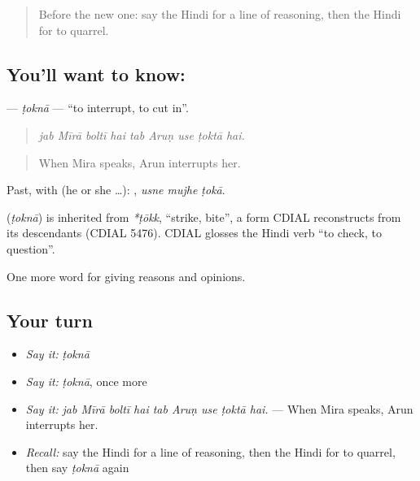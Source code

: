 \label{lesson:HI-C346-tokna}



\begin{quote}
Before the new one: say the Hindi for a line of reasoning, then the Hindi for to quarrel.
\end{quote}

\subsection*{You'll want to know: }
\textbf{} — \emph{ṭoknā} — \textquotedblleft{}to interrupt, to cut in\textquotedblright{}.

\begin{quote}
        
\end{quote}

\begin{quote}
\emph{jab Mīrā boltī hai tab Aruṇ use ṭoktā hai.}
\end{quote}

\begin{quote}
When Mira speaks, Arun interrupts her.
\end{quote}

Past, with  (he or she …):   , \emph{usne mujhe ṭokā}.

\begin{cousinweb}
\textbf{} (\emph{ṭoknā}) is inherited from \emph{*ṭōkk}, \textquotedblleft{}strike, bite\textquotedblright{}, a form CDIAL reconstructs from its descendants (CDIAL 5476). CDIAL glosses the Hindi verb \textquotedblleft{}to check, to question\textquotedblright{}.
\end{cousinweb}

\begin{grammarlens}[title={What you've built}]
One more word for giving reasons and opinions.
\end{grammarlens}

\subsection*{Your turn}
\begin{itemize}
\raggedright
  \item \emph{Say it:} \emph{ṭoknā}
  \item \emph{Say it:} \emph{ṭoknā}, once more
  \item \emph{Say it:} \emph{jab Mīrā boltī hai tab Aruṇ use ṭoktā hai.} — When Mira speaks, Arun interrupts her.
  \item \emph{Recall:} say the Hindi for a line of reasoning, then the Hindi for to quarrel, then say \emph{ṭoknā} again
\end{itemize}

